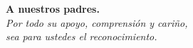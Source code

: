 \raggedleft \textbf{A nuestros padres.}\\[\baselineskip]
\raggedleft \textit{Por todo su apoyo, comprensi\'on y cari\~{n}o,}\\
\raggedleft \textit{sea para ustedes el reconocimiento.}\\






